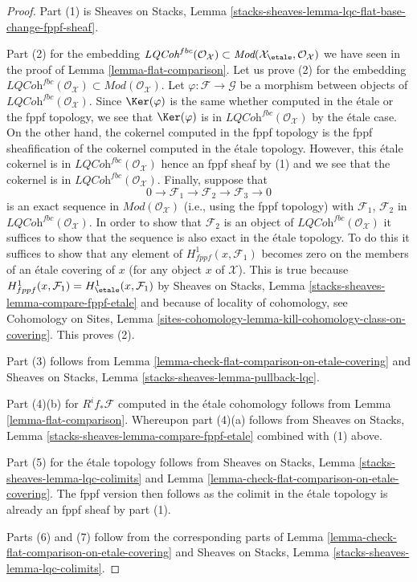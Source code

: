 \begin{proof}
Part (1) is
Sheaves on Stacks, Lemma
\ref{stacks-sheaves-lemma-lqc-flat-base-change-fppf-sheaf}.

\medskip\noindent
Part (2) for the embedding
$\textit{LQCoh}^{fbc}(\mathcal{O}_\mathcal{X}) \subset
\textit{Mod}(\mathcal{X}_\etale, \mathcal{O}_\mathcal{X})$
we have seen in the proof of
Lemma \ref{lemma-flat-comparison}.
Let us prove (2) for the embedding
$\textit{LQCoh}^{fbc}(\mathcal{O}_\mathcal{X}) \subset
\textit{Mod}(\mathcal{O}_\mathcal{X})$.
Let $\varphi : \mathcal{F} \to \mathcal{G}$ be a morphism between
objects of $\textit{LQCoh}^{fbc}(\mathcal{O}_\mathcal{X})$. Since
$\Ker(\varphi)$
is the same whether computed in the \'etale or the fppf
topology, we see that $\Ker(\varphi)$ is in
$\textit{LQCoh}^{fbc}(\mathcal{O}_\mathcal{X})$
by the \'etale case. On the other hand,
the cokernel computed in the fppf topology is the fppf sheafification
of the cokernel computed in the \'etale topology. However, this
\'etale cokernel is in $\textit{LQCoh}^{fbc}(\mathcal{O}_\mathcal{X})$
hence an fppf sheaf
by (1) and we see that the cokernel is in
$\textit{LQCoh}^{fbc}(\mathcal{O}_\mathcal{X})$.
Finally, suppose that
$$
0 \to \mathcal{F}_1 \to \mathcal{F}_2 \to \mathcal{F}_3 \to 0
$$
is an exact sequence in $\textit{Mod}(\mathcal{O}_\mathcal{X})$
(i.e., using the fppf topology) with $\mathcal{F}_1$, $\mathcal{F}_2$
in $\textit{LQCoh}^{fbc}(\mathcal{O}_\mathcal{X})$. In order to show that
$\mathcal{F}_2$ is an object of $\textit{LQCoh}^{fbc}(\mathcal{O}_\mathcal{X})$
it suffices to show that
the sequence is also exact in the \'etale topology. To do this it
suffices to show that any element of $H^1_{fppf}(x, \mathcal{F}_1)$
becomes zero on the members of an \'etale covering of $x$ (for any
object $x$ of $\mathcal{X}$). This is true because
$H^1_{fppf}(x, \mathcal{F}_1) = H^1_\etale(x, \mathcal{F}_1)$ by
Sheaves on Stacks, Lemma \ref{stacks-sheaves-lemma-compare-fppf-etale}
and because of locality of cohomology, see
Cohomology on Sites, Lemma
\ref{sites-cohomology-lemma-kill-cohomology-class-on-covering}.
This proves (2).

\medskip\noindent
Part (3) follows from
Lemma \ref{lemma-check-flat-comparison-on-etale-covering}
and
Sheaves on Stacks, Lemma \ref{stacks-sheaves-lemma-pullback-lqc}.

\medskip\noindent
Part (4)(b) for $R^if_*\mathcal{F}$ computed in the \'etale cohomology
follows from Lemma \ref{lemma-flat-comparison}.
Whereupon part (4)(a) follows from
Sheaves on Stacks, Lemma \ref{stacks-sheaves-lemma-compare-fppf-etale}
combined with (1) above.

\medskip\noindent
Part (5) for the \'etale topology follows from
Sheaves on Stacks, Lemma \ref{stacks-sheaves-lemma-lqc-colimits} and
Lemma \ref{lemma-check-flat-comparison-on-etale-covering}.
The fppf version then follows as the colimit in the \'etale
topology is already an fppf sheaf by part (1).

\medskip\noindent
Parts (6) and (7) follow from the corresponding parts of
Lemma \ref{lemma-check-flat-comparison-on-etale-covering} and
Sheaves on Stacks, Lemma \ref{stacks-sheaves-lemma-lqc-colimits}.
\end{proof}

